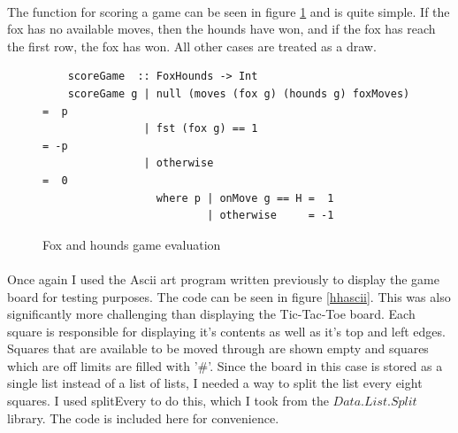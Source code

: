 \documentclass[10pt]{article}
\begin{document}
    \paragraph{} The function for scoring a game can be seen in figure \ref{hheval}
    and is quite simple.  If the fox has no available moves, then the hounds have won,
    and if the fox has reach the first row, the fox has won.  All other cases are 
    treated as a draw.

    \begin{figure}[ht]
        \centering
        \begin{verbatim}
    scoreGame  :: FoxHounds -> Int
    scoreGame g | null (moves (fox g) (hounds g) foxMoves) =  p
                | fst (fox g) == 1                         = -p
                | otherwise                                =  0
                  where p | onMove g == H =  1
                          | otherwise     = -1        \end{verbatim}
        \caption{Fox and hounds game evaluation} \label{hheval}
    \end{figure}

    \paragraph{} Once again I used the Ascii art program written previously to display
    the game board for testing purposes.  The code can be seen in figure \ref{hhascii}.
    This was also significantly more challenging than displaying the Tic-Tac-Toe board.
    Each square is responsible for displaying it's contents as well as it's top and left
    edges.  Squares that are available to be moved through are shown empty and squares
    which are off limits are filled with '\#'.  Since the board in this case is stored
    as a single list instead of a list of lists, I needed a way to split the list every
    eight squares.  I used splitEvery to do this, which I took from the $Data.List.Split$
    library.  The code is included here for convenience.
\end{document}
